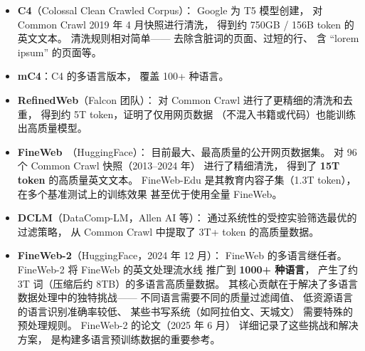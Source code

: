 \begin{itemize}[noitemsep]
  \item \textbf{C4}（Colossal Clean Crawled Corpus）：
        Google 为 T5 模型创建，
        对 Common Crawl 2019 年 4 月快照进行清洗，
        得到约 750GB / 156B token 的英文文本。
        清洗规则相对简单——
        去除含脏词的页面、过短的行、
        含 ``lorem ipsum'' 的页面等。
  \item \textbf{mC4}：C4 的多语言版本，
        覆盖 100+ 种语言。
  \item \textbf{RefinedWeb}（Falcon 团队）：
        对 Common Crawl 进行了更精细的清洗和去重，
        得到约 5T token，证明了仅用网页数据
        （不混入书籍或代码）也能训练出高质量模型。
  \item \textbf{FineWeb}~\cite{penedo2024fineweb}（HuggingFace）：
        目前最大、最高质量的公开网页数据集。
        对 96 个 Common Crawl 快照（2013--2024 年）
        进行了精细清洗，
        得到了 \textbf{15T token} 的高质量英文文本。
        FineWeb-Edu 是其教育内容子集（1.3T token），
        在多个基准测试上的训练效果
        甚至优于使用全量 FineWeb。
  \item \textbf{DCLM}（DataComp-LM，Allen AI 等）：
        通过系统性的受控实验筛选最优的过滤策略，
        从 Common Crawl 中提取了 3T+ token 的高质量数据。
  \item \textbf{FineWeb-2}（HuggingFace，2024 年 12 月）：
        FineWeb 的多语言继任者。
        FineWeb-2 将 FineWeb 的英文处理流水线
        推广到 \textbf{1000+ 种语言}，
        产生了约 3T 词（压缩后约 8TB）的多语言高质量数据。
        其核心贡献在于解决了多语言数据处理中的独特挑战——
        不同语言需要不同的质量过滤阈值、
        低资源语言的语言识别准确率较低、
        某些书写系统（如阿拉伯文、天城文）
        需要特殊的预处理规则。
        FineWeb-2 的论文（2025 年 6 月）
        详细记录了这些挑战和解决方案，
        是构建多语言预训练数据的重要参考。

\end{itemize}
